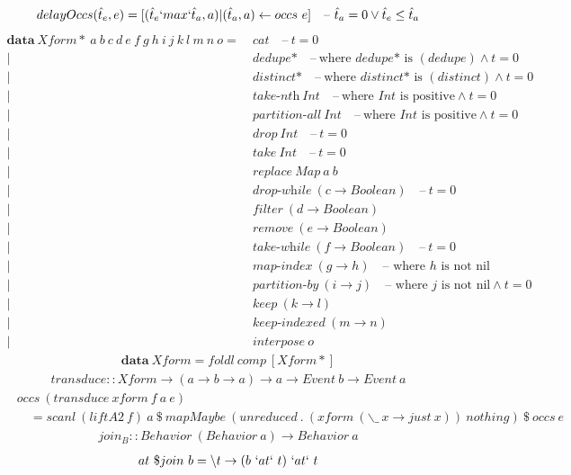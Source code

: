 \documentclass[fleqn]{amsart}
\newcommand{\dash}{\quad\text{--}\ }
\newcommand{\epoch}{t = 0}
\newcommand{\zeroarity}[1]{&\ \textit{#1*} \dash \text{where }\textit{#1*}\text{ is }(#1)}
\newcommand{\positive}[1]{&\ \textit{#1}\ Int \dash \text{where }Int\text{ is positive}}
\newcommand{\integer}[1]{&\ #1\ Int}
\newcommand{\predicate}[2]{&\ \textit{#1}\ (#2 \rightarrow Boolean)}
\newcommand{\nonnillable}[3]{&\ \textit{#1}\ (#2 \rightarrow #3)\quad\text{-- where }#3\text{ is not nil}}
\newcommand{\any}[3]{&\ \textit{#1}\ (#2 \rightarrow #3)}
\begin{document}
\begin{align*}
  delayOccs(\hat{t}_e, e) = [(\hat{t}_e  `max` \hat{t}_a, a) | (\hat{t}_a, a) \leftarrow occs\ e] \dash \hat{t}_a = 0 \lor \hat{t}_e \leq \hat{t}_a
\end{align*}
\begin{align*}
  \mathbf{data}\ Xform{*}\ a\ b\ c\ d\ e\ f\ g\ h\ i\ j\ k\ l\ m\ n\ o =&\ cat \dash \epoch\\
  |\zeroarity{dedupe} \land \epoch\\
  |\zeroarity{distinct} \land \epoch\\
  |\positive{take-nth} \land \epoch\\
  |\positive{partition-all} \land \epoch\\
  |\integer{drop} \dash \epoch\\
  |\integer{take} \dash \epoch\\
  |&\ replace\ Map\ a\ b\\
  |\predicate{drop-while}{c} \dash \epoch\\
  |\predicate{filter}{d}\\
  |\predicate{remove}{e}\\
  |\predicate{take-while}{f} \dash \epoch\\
  |\nonnillable{map-index}{g}{h}\\
  |\nonnillable{partition-by}{i}{j} \land \epoch\\
  |\any{keep}{k}{l}\\
  |\any{keep-indexed}{m}{n}\\
  |&\ interpose\ o
\end{align*}
\begin{align*}
  \mathbf{data}\ Xform = foldl\ comp\ [Xform*]
\end{align*}
\begin{align*}
  transduce :: Xform \rightarrow (a \rightarrow b \rightarrow a) \rightarrow a \rightarrow Event\ b \rightarrow Event\ a
\end{align*}
\begin{align*}
  &occs\ (transduce\ xform\ f\ a\ e)\\
  &\quad= scanl\ (liftA2\ f)\ a\ \$\ mapMaybe\ (unreduced\ .\ (xform\ (\backslash\_\ x\rightarrow just\ x))\ nothing)\ \$\ occs\ e
\end{align*}
\begin{align*}
  join_B :: Behavior\ (Behavior\ a) \rightarrow Behavior\ a
\end{align*}
\begin{align*}
  at\ \$join\ b =\backslash t \rightarrow (b\ `at` \ t)\ `at` \ t
\end{align*}
\end{document}
